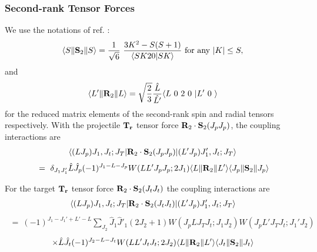 \documentclass[11pt,a4paper]{article}
\begin{document}
\subsubsection{Second-rank Tensor Forces}

We use the notations of ref. \cite{satch60}:
\begin{eqnarray}
\langle S \| {\bf S}_2 \| S\rangle = {1 \over \sqrt 6} ~
      { 3K^2 - S(S+1) \over \langle SK20 | SK\rangle}
      \mbox{ for  any } | K | \leq S ,
\end{eqnarray}
and
\begin{eqnarray}
\langle L' \| {\bf R}_2 \| L\rangle = \sqrt {2 \over 3}
       {\hat L \over \hat{L'}}\langle L~0~2~0~ | L' ~0~\rangle
\end{eqnarray}
for the reduced matrix elements of the second-rank spin and radial tensors
respectively.
With the projectile $ {\bf T_r} $ tensor force
$ {\bf R}_2 \cdot {\bf S}_2 ( J_p J_p ) $,
the coupling interactions are
\begin{eqnarray} \nonumber
\left\langle (L J_p ) J_1 , J_t ; J_T |  {\bf R}_2 \cdot {\bf S}_2 ( J_p J_p )
                             | ( L' J_p ) J'_1 , J_t ; J_T \right\rangle
\end{eqnarray}
\begin{eqnarray}
 ~=~
     \delta_{ J_1 J'_1 } \hat L \hat J_p (-1)^{ J_1 - L - J_p }
    W(L L' J_p J_p ; 2 J_1 )\langle L \| {\bf R}_2 \| L'\rangle
                              \langle J_p \| {\bf S}_2 \| J_p\rangle
\end{eqnarray}

For the target $ {\bf T_r} $ tensor force
$ {\bf R}_2 \cdot {\bf S}_2 ( J_t J_t ) $
the coupling interactions are
\begin{eqnarray} \nonumber
\left\langle (L J_p ) J_1 , J_t ; J_T |  {\bf R}_2 \cdot {\bf S}_2 ( J_t J_t )
                             | ( L' J_p ) J'_1 , J_t ; J_T \right\rangle
\end{eqnarray}
\begin{eqnarray}  \nonumber
 ~=~
    (-1)^{J_1 - J_1' + L' - L}
 \sum _ {J_2} \hat J_1 \hat J'_1 (2 J_2 + 1)
  W( J_p L J_T J_t ; J_1 J_2 ) W( J_p L' J_T J_t ; J_1' J_2 )
\end{eqnarray}
\begin{eqnarray}
   \times  \hat L \hat J_t (-1)^{ J_2 - L - J_t }
    W(L L' J_t J_t ; 2 J_2 )\langle L \| {\bf R}_2 \| L'\rangle
                              \langle J_t \| {\bf S}_2 \| J_t\rangle
\end{eqnarray}
\end{document}

